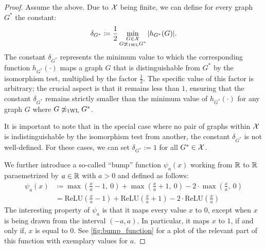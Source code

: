 \begin{proof}
    Assume the above. Due to $\mathcal{X}$ being finite, we can define for every graph $G^*$ the constant:
    \begin{equation*}
        \delta_{G^*} \coloneqq \frac{1}{2} \min_{\substack{G \in \mathcal{X}  \\  G \not\simeq_{\text{1WL}} G^*}} |h_{G^*}(G)|.
    \end{equation*}
    The constant $\delta_{G^*}$ represents the minimum value to which the corresponding function $h_{G^*}(\cdot)$ maps a graph $G$ that is distinguishable from $G^*$ by the \wl isomorphism test, multiplied by the factor $\frac{1}{2}$. The specific value of this factor is arbitrary; the crucial aspect is that it remains less than $1$, ensuring that the constant $\delta_{G^*}$ remains strictly smaller than the minimum value of $h_{G^*}(\cdot)$ for any graph $G$ where $G\not \simeq_{\text{1WL}} G^*$.

    It is important to note that in the special case where no pair of graphs within $\mathcal{X}$ is indistinguishable by the \wl isomorphism test from another, the constant $\delta_{G^*}$ is not well-defined. For these cases, we can set $\delta_{G^*} := 1$ for all $G^* \in \mathcal{X}$.

    We further introduce a so-called ``bump'' function $\psi_a(x)$ working from $\mathbb{R}$ to $\mathbb{R}$ paraemetrized by $a \in \mathbb{R}$ with $a > 0$ and defined as follows:
    \begin{align}\label{eq:lemma_encoding_indicator_func2}
        \psi_a(x) &\coloneqq \max(\frac{x}{a} -1,\ 0) + \max(\frac{x}{a}+1, \ 0) - 2 \cdot \max(\frac{x}{a}, \ 0) \nonumber\\
        &= \text{ReLU}(\frac{x}{a} -1) + \text{ReLU}(\frac{x}{a}+1) - 2 \cdot \text{ReLU}(\frac{x}{a})
    \end{align}
    The interesting property of $\psi_a$ is that it maps every value $x$ to $0$, except when $x$ is being drawn from the interval $(-a, a)$. In particular, it maps $x$ to $1$, if and only if, $x$ is equal to $0$. See \cref{fig:bump_function} for a plot of the relevant part of this function with exemplary values for $a$.


\end{proof}
